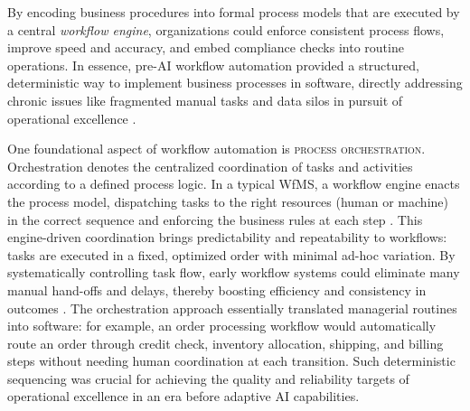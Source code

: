 By encoding business procedures into formal process models that are executed by a central \emph{workflow engine}, organizations could enforce consistent process flows, improve speed and accuracy, and embed compliance checks into routine operations. In essence, pre-AI workflow automation provided a structured, deterministic way to implement business processes in software, directly addressing chronic issues like fragmented manual tasks and data silos in pursuit of operational excellence \parencite{basuResearch2002}.

One foundational aspect of workflow automation is \textsc{process orchestration}. Orchestration denotes the centralized coordination of tasks and activities according to a defined process logic. In a typical WfMS, a workflow engine enacts the process model, dispatching tasks to the right resources (human or machine) in the correct sequence and enforcing the business rules at each step \parencite{basuResearch2002}. This engine-driven coordination brings predictability and repeatability to workflows: tasks are executed in a fixed, optimized order with minimal ad-hoc variation. By systematically controlling task flow, early workflow systems could eliminate many manual hand-offs and delays, thereby boosting efficiency and consistency in outcomes \parencite{stohrWorkflow2001}. The orchestration approach essentially translated managerial routines into software: for example, an order processing workflow would automatically route an order through credit check, inventory allocation, shipping, and billing steps without needing human coordination at each transition. Such deterministic sequencing was crucial for achieving the quality and reliability targets of operational excellence in an era before adaptive AI capabilities.

